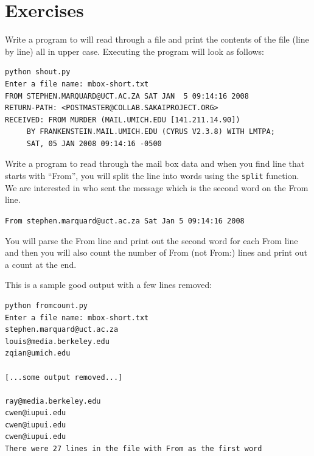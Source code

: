 \documentclass[10pt]{book}
\begin{document}
\section{Exercises}

\begin{ex}
Write a program to will read through a file and print the contents 
of the file (line by line) all in upper case.  Executing the program 
will look as follows:

\beforeverb
\begin{verbatim}
python shout.py
Enter a file name: mbox-short.txt
FROM STEPHEN.MARQUARD@UCT.AC.ZA SAT JAN  5 09:14:16 2008
RETURN-PATH: <POSTMASTER@COLLAB.SAKAIPROJECT.ORG>
RECEIVED: FROM MURDER (MAIL.UMICH.EDU [141.211.14.90])
	 BY FRANKENSTEIN.MAIL.UMICH.EDU (CYRUS V2.3.8) WITH LMTPA;
	 SAT, 05 JAN 2008 09:14:16 -0500
\end{verbatim}
\afterverb
\end{ex}

\begin{ex}
Write a program to read through the mail box data and when you find 
line that starts with ``From'', you will split the line into 
words using the {\tt split} function. We are interested in 
who sent the message which is the second word on the From line.

{\tt From stephen.marquard@uct.ac.za Sat Jan  5 09:14:16 2008 }

You will parse the From line and print out the second word for 
each From line and then you will also count the number of 
From (not From:) lines and print out a count at the end.

This is a sample good output with a few lines removed:

\beforeverb
\begin{verbatim}
python fromcount.py 
Enter a file name: mbox-short.txt
stephen.marquard@uct.ac.za
louis@media.berkeley.edu
zqian@umich.edu

[...some output removed...]

ray@media.berkeley.edu
cwen@iupui.edu
cwen@iupui.edu
cwen@iupui.edu
There were 27 lines in the file with From as the first word
\end{verbatim}
\afterverb

\end{ex}
\end{document}
